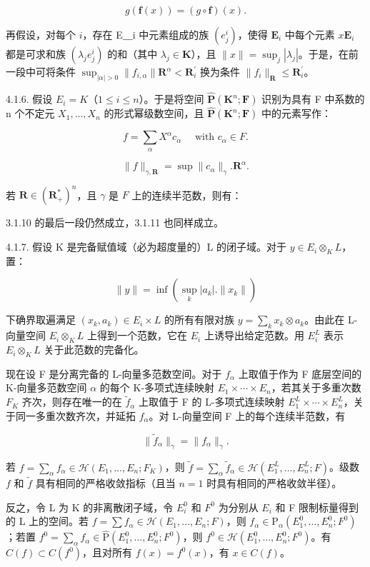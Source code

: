 \[
g (\mathbf {f} (x)) = (g \circ \mathbf {f}) (x).
\]

再假设，对每个 \(i\)，存在 E＿i 中元素组成的族 \((e_{j}^{i})\)，使得 \(\mathbf{E}_{i}\) 中每个元素 \(x\)\(\mathbf{E}_{i}\) 都是可求和族 \((\lambda_{j}e_{j}^{i})\) 的和（其中 \(\lambda_{j}\in\mathbf{K}\)），且 \(\|x\|=\sup_{j}|\lambda_{j}|\)。于是，在前一段中可将条件 \(\sup_{|\alpha|>0}\|f_{i,\alpha}\|\mathbf{R}^{\alpha}<\mathbf{R}_{i}^{\prime}\) 换为条件 \(\|f_{i}\|_{\mathbf{R}}\leqslant\mathbf{R}_{i}^{\prime}\)。

4.1.6. 假设 \(E_{i} = K\)（\(1 \leqslant i \leqslant n\)）。于是将空间 \(\hat{\mathbf{P}}(\mathbf{K}^{n}; \mathbf{F})\) 识别为具有 F 中系数的 n 个不定元 \(X_{1}, \ldots, X_{n}\) 的形式幂级数空间，且 \(\hat{\mathbf{P}}(\mathbf{K}^{n}; \mathbf{F})\) 中的元素写作：

\[
f = \sum_ {\alpha} X ^ {\alpha} c _ {\alpha} \quad \text { with } c _ {\alpha} \in F.
\]

\[
\| f \| _ {\gamma , \mathbf {R}} = \sup \| c _ {\alpha} \| _ {\gamma}. \mathbf {R} ^ {\alpha}.
\]

若 \(\mathbf{R} \in (\mathbf{R}_{+}^{*})^{n}\)，且 \(\gamma\) 是 \(F\) 上的连续半范数，则有：

3.1.10 的最后一段仍然成立，3.1.11 也同样成立。

4.1.7. 假设 K 是完备赋值域（必为超度量的）L 的闭子域。对于 \(y \in E_{i} \otimes_{K} L\)，置：

\[
\| y \| = \inf (\sup _ {k} | a _ {k} |. \| x _ {k} \|)
\]

下确界取遍满足 \((x_{k}, a_{k}) \in E_{i} \times L\) 的所有有限对族 \(y = \sum_{k} x_{k} \otimes a_{k}\)。由此在 L-向量空间 \(E_{i} \otimes_{K} L\) 上得到一个范数，它在 \(E_{i}\) 上诱导出给定范数。用 \(E_{i}^{L}\) 表示 \(E_{i} \otimes_{K} L\) 关于此范数的完备化。

现在设 F 是分离完备的 L-向量多范数空间。对于 \(f_{\alpha}\) 上取值于作为 F 底层空间的 K-向量多范数空间 \(\alpha\) 的每个 K-多项式连续映射 \(E_1 \times \cdots \times E_n\)，若其关于多重次数 \(F_K\) 齐次，则存在唯一的在 \(\tilde{f}_{\alpha}\) 上取值于 F 的 L-多项式连续映射 \(E_1^L \times \cdots \times E_n^L\)，关于同一多重次数齐次，并延拓 \(f_{\alpha}\)。对 L-向量空间 F 上的每个连续半范数，有

\[
\| \tilde {f} _ {\alpha} \| _ {\gamma} = \| f _ {\alpha} \| _ {\gamma}.
\]

若 \(f = \sum_{\alpha} f_{\alpha} \in \mathcal{H}(E_1, \ldots, E_n; F_K)\)，则 \(\tilde{f} = \sum_{\alpha} \tilde{f}_{\alpha} \in \mathcal{H}(E_1^L, \ldots, E_n^L; F)\)。级数 \(f\) 和 \(\tilde{f}\) 具有相同的严格收敛指标（且当 \(n = 1\) 时具有相同的严格收敛半径）。

反之，令 L 为 K 的非离散闭子域，令 \(E_{i}^{0}\) 和 \(F^{0}\) 为分别从 \(E_{i}\) 和 F 限制标量得到的 L 上的空间。若 \(f = \sum f_{\alpha} \in \mathcal{H}(E_{1}, \ldots, E_{n}; F)\)，则 \(f_{\alpha} \in \mathrm{P}_{\alpha}(E_{1}^{0}, \ldots, E_{n}^{0}; F^{0})\)；若置 \(f^{0} = \sum_{\alpha} f_{\alpha} \in \hat{\mathrm{P}}(E_{1}^{0}, \ldots, E_{n}^{0}; F^{0})\)，则 \(f^{0} \in \mathcal{H}(E_{1}^{0}, \ldots, E_{n}^{0}; F^{0})\)。有 \(C(f) \subset C(f^{0})\)，且对所有 \(f(x) = f^{0}(x)\)，有 \(x \in C(f)\)。


